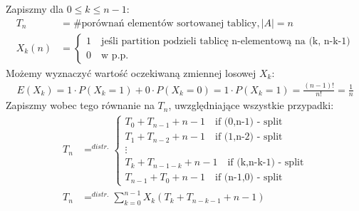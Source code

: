 \documentclass{article}
\numberwithin{equation}{subsection}
\begin{document}
\noindent
Zapiszmy dla $0 \leq k \leq n - 1$:
\begin{align}
    T_n &= \text{\# porównań elementów sortowanej tablicy}, |A|=n\\
    X_k(n) &= \begin{cases}
        1 \quad \text{jeśli partition podzieli tablicę n-elementową na (k, n-k-1)}\\
        0 \quad \text{w p.p.}
    \end{cases}
\end{align}
Możemy wyznaczyć wartość oczekiwaną zmiennej losowej $X_k$:
\begin{align}
    E(X_k) = 1\cdot P(X_k=1) + 0\cdot P(X_k=0) = 1\cdot P(X_k=1) = \frac{(n-1)!}{n!} = \frac{1}{n}
\end{align}
Zapiszmy wobec tego równanie na $T_n$, uwzględniające wszystkie przypadki:
\begin{align}
    T_n &=^{distr.} \begin{cases}
        T_0 + T_{n-1} + n-1 \quad \text{if (0,n-1) - split}\\
        T_1 + T_{n-2} + n-1 \quad \text{if (1,n-2) - split}\\
        \vdots\\
        T_k + T_{n-1-k} + n - 1 \quad \text{if (k,n-k-1) - split}\\
        T_{n-1} + T_{0} + n - 1 \quad \text{if (n-1,0) - split}
    \end{cases}\\
    T_n &=^{distr.} \sum_{k=0}^{n-1} X_k(T_k+T_{n-k-1} + n-1)
\end{align}
\end{document}

